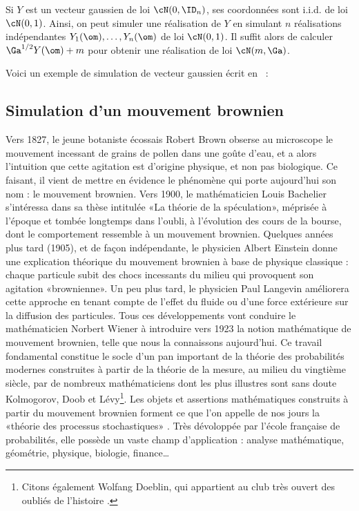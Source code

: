Si $Y$ est un vecteur gaussien de loi $\cN(0,\ID_n)$, ses coordonnées sont
i.i.d. de loi $\cN(0,1)$. Ainsi, on peut simuler une réalisation de $Y$ en
simulant $n$ réalisations indépendantes $Y_1(\om),\ldots,Y_n(\om)$ de loi
$\cN(0,1)$. Il suffit alors de calculer $\Ga^{1/2}Y(\om)+m$ pour
obtenir une réalisation de loi $\cN(m,\Ga)$.

Voici un exemple de simulation de vecteur gaussien écrit en \ML{}~:
%
%

%
\subsection{Simulation d'un mouvement brownien}
%

Vers 1827, le jeune botaniste écossais Robert Brown obserse au microscope le
mouvement incessant de grains de pollen dans une goûte d'eau, et a alors
l'intuition que cette agitation est d'origine physique, et non pas biologique.
Ce faisant, il vient de mettre en évidence le phénomène qui porte aujourd'hui
son nom : le mouvement brownien. Vers 1900, le mathématicien Louis Bachelier
s'intéressa dans sa thèse intitulée «La théorie de la spéculation», méprisée à
l'époque et tombée longtemps dans l'oubli, à l'évolution des cours de la
bourse, dont le comportement ressemble à un mouvement brownien. Quelques
années plus tard (1905), et de façon indépendante, le physicien Albert
Einstein donne une explication théorique du mouvement brownien à base de
physique classique : chaque particule subit des chocs incessants du milieu qui
provoquent son agitation «brownienne». Un peu plus tard, le physicien Paul
Langevin améliorera cette approche en tenant compte de l'effet du fluide ou
d'une force extérieure sur la diffusion des particules. Tous ces
développements vont conduire le mathématicien Norbert Wiener à introduire vers
1923 la notion mathématique de mouvement brownien, telle que nous la
connaissons aujourd'hui. Ce travail fondamental constitue le socle d'un pan
important de la théorie des probabilités modernes construites à partir de la
théorie de la mesure, au milieu du vingtième siècle, par de nombreux
mathématiciens dont les plus illustres sont sans doute Kolmogorov, Doob et
Lévy\footnote{Citons également Wolfang Doeblin, qui appartient au club très
  ouvert des oubliés de l'histoire \cite{doeblin}.}. Les objets et assertions
mathématiques construits à partir du mouvement brownien forment ce que l'on
appelle de nos jours la «théorie des processus stochastiques»
\cite{bass-2,karatzas-shreve}. Très dévoloppée par l'école française de
probabilités, elle possède un vaste champ d'application : analyse
mathématique, géométrie, physique, biologie, finance\ldots

